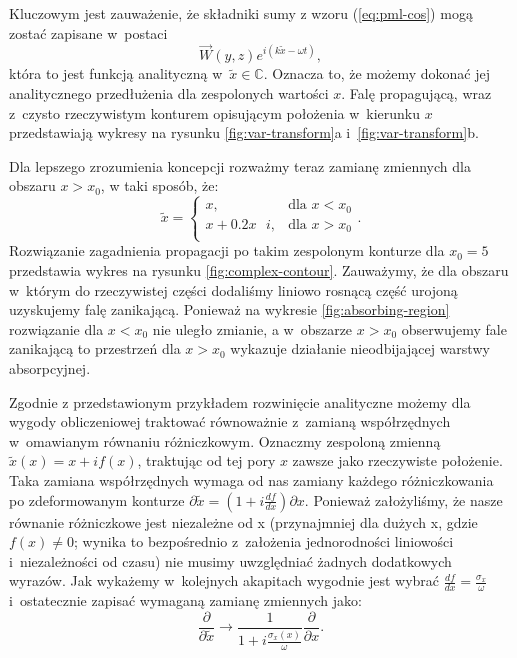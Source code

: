 Kluczowym jest zauważenie, że składniki sumy z wzoru (\ref{eq:pml-cos}) mogą zostać zapisane w~postaci
\begin{equation}
\vec{W}(y,z)e^{i(k\tilde{x}-\omega t)},
\end{equation}
która to jest funkcją analityczną w~$\tilde{x}\in \mathbb{C}$. Oznacza to, że możemy dokonać jej analitycznego przedłużenia dla zespolonych wartości $x$. Falę propagującą, wraz z~czysto rzeczywistym konturem opisującym położenia w~kierunku $x$ przedstawiają wykresy na rysunku \ref{fig:var-transform}a i~\ref{fig:var-transform}b. 

Dla lepszego zrozumienia koncepcji rozważmy teraz zamianę zmiennych dla obszaru $x>x_0$, w taki sposób, że: 
\begin{equation}
\tilde{x}=  
\begin{cases} 
        x, & \mbox{dla } x< x_0 \\ 
        x+0.2x\mbox{ }i, & \mbox{dla } x>x_0 \\
\end{cases}.
\end{equation}
Rozwiązanie zagadnienia propagacji po takim zespolonym konturze dla $x_0=5$ przedstawia wykres na rysunku \ref{fig:complex-contour}. Zauważymy, że dla obszaru w~którym do rzeczywistej części dodaliśmy liniowo rosnącą część urojoną uzyskujemy falę zanikającą. Ponieważ na wykresie \ref{fig:absorbing-region} rozwiązanie dla $x<x_0$ nie uległo zmianie, a w~obszarze $x>x_0$ obserwujemy fale zanikającą to przestrzeń dla $x>x_0$ wykazuje działanie nieodbijającej warstwy absorpcyjnej.

Zgodnie z przedstawionym przykładem rozwinięcie analityczne możemy dla wygody obliczeniowej traktować równoważnie z~zamianą współrzędnych w~omawianym równaniu różniczkowym. Oznaczmy zespoloną zmienną $\tilde{x}(x)=x+if(x)$, traktując od tej pory $x$ zawsze jako rzeczywiste położenie. Taka zamiana współrzędnych wymaga od nas zamiany każdego różniczkowania po zdeformowanym konturze $\partial \tilde{x} = (1+i\frac{df}{dx}) \partial x$. Ponieważ założyliśmy, że nasze równanie różniczkowe jest niezależne od x (przynajmniej dla dużych x, gdzie $f(x)\ne0$; wynika to bezpośrednio z~założenia jednorodności liniowości i~niezależności od czasu) nie musimy uwzględniać żadnych dodatkowych wyrazów. Jak wykażemy w~kolejnych akapitach wygodnie jest wybrać $\frac{df}{dx}=\frac{\sigma_x}{\omega}$ i~ostatecznie zapisać wymaganą zamianę zmiennych jako:
\begin{equation}
	\frac{\partial}{\partial \tilde{x}} \to \frac{1} {1+i \frac{\sigma_x(x)}{\omega}} \frac{\partial}{\partial x}.
	\label{eq:pml-variable-change}
\end{equation}

